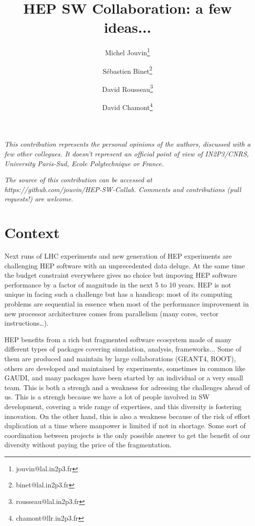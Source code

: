 \documentclass[11pt]{article} %
\title{HEP SW Collaboration: a few ideas...}
\author[1]{Michel Jouvin\thanks{jouvin@lal.in2p3.fr}}
\author[1]{S\'ebastien Binet\thanks{binet@lal.in2p3.fr}}
\author[1]{David Rousseau\thanks{rousseau@lal.in2p3.fr}}
\author[2]{David Chamont\thanks{chamont@llr.in2p3.fr}}
\affil[1]{LAL, IN2P3/CNRS \& University Paris-Sud, Orsay, France}
\affil[2]{LLR, IN2P3/CNRS \& Ecole Polytechnique, Palaiseau, France}
\begin{document}
\maketitle

\emph{\small This contribution represents the personal opinions of the authors, discussed with a few other collegues. It doesn't represent
an official point of view of IN2P3/CNRS, University Paris-Sud, Ecole Polytechnique or France.}

\medskip
\emph{\small The source of this contribution can be accessed at https://github.com/jouvin/HEP-SW-Collab. Comments and contributions (pull requests!) are welcome.}

\section{Context}

Next runs of LHC experiments and new generation of HEP experiments are
challenging HEP software with an unprecedented data deluge. At the
same time the budget constraint everywhere gives no choice but
impoving HEP software performance by a factor of magnitude in the next
5 to 10 years. HEP is not unique in facing such a challenge but has a
handicap: most of its computing problems are sequential in essence
when most of the performance improvement in new processor
architectures comes from parallelism (many cores, vector
instructions\ldots).

HEP benefits from a rich but fragmented software ecosystem made of
many different types of packages covering simulation, analysis,
frameworks... Some of them are produced and maintain by large
collaborations (GEANT4, ROOT), others are developed and maintained by
experiments, sometimes in common like GAUDI, and many packages have
been started by an individual or a very small team. This is both a
strengh and a weakness for adressing the challenges ahead of us. This
is a strengh because we have a lot of people involved in SW
development, covering a wide range of expertises, and this diversity is
fostering innovation. On the other hand, this is also a weakness
because of the risk of effort duplication at a time where manpower is
limited if not in shortage. Some sort of coordination between projects
is the only possible answer to get the benefit of our diversity
without paying the price of the fragmentation.
\end{document}
